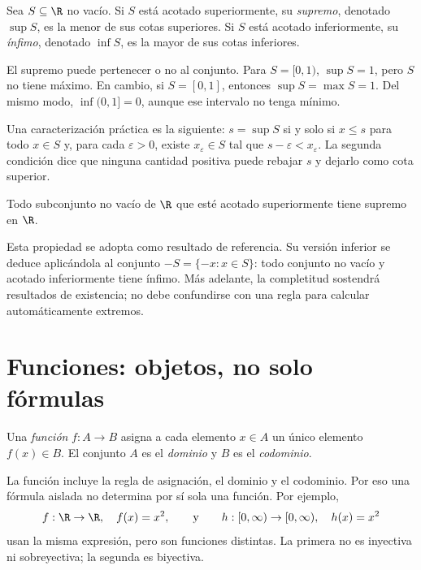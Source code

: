 \begin{definicion}
Sea \(S\subseteq\R\) no vacío. Si \(S\) está acotado superiormente, su
\emph{supremo}, denotado \(\sup S\), es la menor de sus cotas superiores. Si
\(S\) está acotado inferiormente, su \emph{ínfimo}, denotado \(\inf S\), es la
mayor de sus cotas inferiores.
\end{definicion}

El supremo puede pertenecer o no al conjunto. Para \(S=[0,1)\),
\(\sup S=1\), pero \(S\) no tiene máximo. En cambio, si \(S=[0,1]\), entonces
\(\sup S=\max S=1\). Del mismo modo, \(\inf(0,1]=0\), aunque ese intervalo no
tenga mínimo.

Una caracterización práctica es la siguiente: \(s=\sup S\) si y solo si
\(x\le s\) para todo \(x\in S\) y, para cada \(\varepsilon>0\), existe
\(x_\varepsilon\in S\) tal que \(s-\varepsilon<x_\varepsilon\). La segunda
condición dice que ninguna cantidad positiva puede rebajar \(s\) y dejarlo como
cota superior.

\begin{teorema}
Todo subconjunto no vacío de \(\R\) que esté acotado superiormente tiene
supremo en \(\R\).
\end{teorema}

Esta propiedad se adopta como resultado de referencia. Su versión inferior se
deduce aplicándola al conjunto \(-S=\{-x:x\in S\}\): todo conjunto no vacío y
acotado inferiormente tiene ínfimo. Más adelante, la completitud sostendrá
resultados de existencia; no debe confundirse con una regla para calcular
automáticamente extremos.

\section{Funciones: objetos, no solo fórmulas}
\label{sec:funciones-objetos}

\begin{definicion}[Función]
Una \emph{función} \(f:A\to B\) asigna a cada elemento \(x\in A\) un único
elemento \(f(x)\in B\). El conjunto \(A\) es el \emph{dominio} y \(B\) es el
\emph{codominio}.
\end{definicion}

La función incluye la regla de asignación, el dominio y el codominio. Por eso
una fórmula aislada no determina por sí sola una función. Por ejemplo,
\[
 f:\R\to\R,\quad f(x)=x^2,
 \qquad\text{y}\qquad
 h:[0,\infty)\to[0,\infty),\quad h(x)=x^2
\]
usan la misma expresión, pero son funciones distintas. La primera no es
inyectiva ni sobreyectiva; la segunda es biyectiva.

